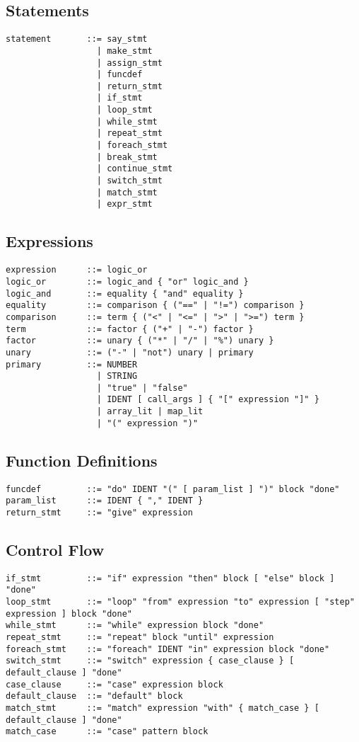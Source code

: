 \documentclass[12pt,a4paper]{article}
\begin{document}
\subsection{Statements}
\begin{lstlisting}
statement       ::= say_stmt
                  | make_stmt
                  | assign_stmt
                  | funcdef
                  | return_stmt
                  | if_stmt
                  | loop_stmt
                  | while_stmt
                  | repeat_stmt
                  | foreach_stmt
                  | break_stmt
                  | continue_stmt
                  | switch_stmt
                  | match_stmt
                  | expr_stmt
\end{lstlisting}

\subsection{Expressions}
\begin{lstlisting}
expression      ::= logic_or
logic_or        ::= logic_and { "or" logic_and }
logic_and       ::= equality { "and" equality }
equality        ::= comparison { ("==" | "!=") comparison }
comparison      ::= term { ("<" | "<=" | ">" | ">=") term }
term            ::= factor { ("+" | "-") factor }
factor          ::= unary { ("*" | "/" | "%") unary }
unary           ::= ("-" | "not") unary | primary
primary         ::= NUMBER
                  | STRING
                  | "true" | "false"
                  | IDENT [ call_args ] { "[" expression "]" }
                  | array_lit | map_lit
                  | "(" expression ")"
\end{lstlisting}

\subsection{Function Definitions}
\begin{lstlisting}
funcdef         ::= "do" IDENT "(" [ param_list ] ")" block "done"
param_list      ::= IDENT { "," IDENT }
return_stmt     ::= "give" expression
\end{lstlisting}

\subsection{Control Flow}
\begin{lstlisting}
if_stmt         ::= "if" expression "then" block [ "else" block ] "done"
loop_stmt       ::= "loop" "from" expression "to" expression [ "step" expression ] block "done"
while_stmt      ::= "while" expression block "done"
repeat_stmt     ::= "repeat" block "until" expression
foreach_stmt    ::= "foreach" IDENT "in" expression block "done"
switch_stmt     ::= "switch" expression { case_clause } [ default_clause ] "done"
case_clause     ::= "case" expression block
default_clause  ::= "default" block
match_stmt      ::= "match" expression "with" { match_case } [ default_clause ] "done"
match_case      ::= "case" pattern block
\end{lstlisting}
\end{document}
